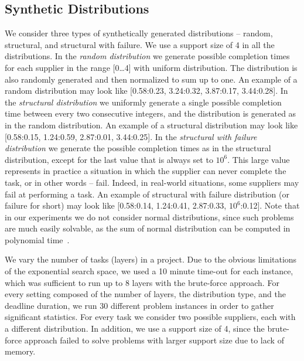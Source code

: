\documentclass[letterpaper]{article} %
\newcommand\Roni[1]{\nb{\textbf{Roni:}}{blue}{#1}}
\begin{document}
\subsection{Synthetic Distributions}
\label{sec:SynthericDist}
We consider three types of synthetically generated distributions -- random, structural, and structural with failure. We use a support size of 4 in all the distributions. In the \emph{random distribution} we generate possible completion times for each supplier in the range [0\dots 4] with uniform distribution. The distribution is also randomly generated and then normalized to sum up to one. An example of a random distribution may look like [0.58:0.23, 3.24:0.32, 3.87:0.17, 3.44:0.28]. 
In the \emph{structural distribution} we uniformly generate a single possible completion time between every two consecutive integers, and the distribution is generated as in the random distribution. An example of a structural distribution may look like [0.58:0.15, 1.24:0.59, 2.87:0.01, 3.44:0.25]. In the \emph{structural with failure distribution} we generate the possible completion times as in the structural distribution, except for the last value that is always set to $10^6$. This large value represents in practice a situation in which the supplier can never complete the task, or in other words -- fail. Indeed, in real-world situations, some suppliers may fail at performing a task. An example of structural with failure distribution (or failure for short) may look like [0.58:0.14, 1.24:0.41, 2.87:0.33, $10^6$:0.12]. 
Note that in our experiments we do not consider normal distributions, since such problems are much easily solvable, as the sum of normal distribution can be computed in polynomial time~\cite{schattenberg2005project,glaubius2009scheduling,olya2014applying}.


We vary the number of tasks (layers) in a project. Due to the obvious limitations of the exponential search space, we used a 10 minute time-out for each instance, which was sufficient to run up to 8 layers with the brute-force approach. For every setting composed of the number of layers, the distribution type, and the deadline duration, we run 30 different problem instances in order to gather significant statistics. For every task we consider two possible suppliers, each with a different distribution. In addition, we use a support size of 4, since the brute-force approach failed to solve problems with larger support size due to lack of memory.   
\end{document}
